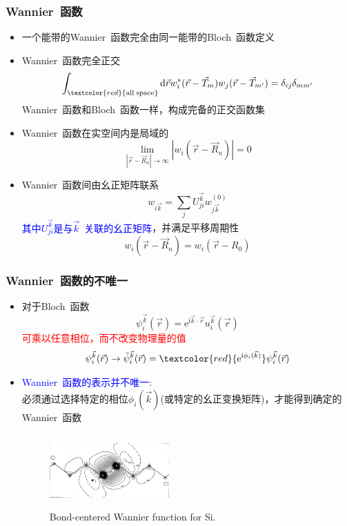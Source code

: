 {\frame
{
	\frametitle{\textrm{Wannier~}函数}
	\begin{itemize}
		\item 一个能带的\textrm{Wannier~}函数完全由同一能带的\textrm{Bloch~}函数定义
		\item \textrm{Wannier~}函数完全正交
			\begin{displaymath}
				\int_{\textcolor{red}{\mathrm{all\; space}}}\mathrm{d}\vec rw_i^{\ast}(\vec r-\vec T_m)w_j(\vec r-\vec T_{m^{\prime}})=\delta_{ij}\delta_{mm^{\prime}}
			\end{displaymath}
			\textrm{Wannier~}函数和\textrm{Bloch~}函数一样，构成完备的正交函数集
		\item \textrm{Wannier~}函数在实空间内是局域的
			\begin{displaymath}
				\lim_{|\vec r-\vec R_n|\rightarrow\infty}|w_i(\vec r-\vec R_n)|=0
			\end{displaymath}
		\item \textrm{Wannier~}函数间由幺正矩阵联系
			\begin{displaymath}
				w_{i\vec k}=\sum_jU_{ji}^{\vec k}w_{j\vec k}^{(0)}
			\end{displaymath}
			\textcolor{blue}{其中$U_{ji}^{\vec k}$是与$\vec k$~关联的幺正矩阵}，并满足平移周期性
\begin{displaymath}
	w_i(\vec r-\vec R_n)=w_i(\vec r-R_0)
\end{displaymath}
	\end{itemize}
}

\frame
{
	\frametitle{\textrm{Wannier~}函数的不唯一}
	\begin{itemize}
		\item 对于\textrm{Bloch~}函数
			\begin{displaymath}
				\psi_i^{\vec k}(\vec r)=\mathrm{e}^{\mathrm{i}\vec k\cdot\vec r}u_i^{\vec k}(\vec r)
			\end{displaymath}
			\textcolor{red}{可乘以任意相位，而不改变物理量的值}
			\begin{displaymath}
				\psi_i^{\vec k}(\vec r)\rightarrow\tilde\psi_i^{\vec k}(\vec r)=\textcolor{red}{\mathrm{e}^{\mathrm{i}\phi_i(\vec k)}}\psi_i^{\vec k}(\vec r)
			\end{displaymath}
		\item \textcolor{blue}{\textrm{Wannier~}函数的表示并不唯一}:\\
必须通过选择特定的相位$\phi_i(\vec k)$(或特定的幺正变换矩阵)，才能得到确定的\textrm{Wannier~}函数 
\begin{figure}[h!]
\centering
\vspace*{-0.2in}
\includegraphics[height=1.1in,width=1.8in,viewport=0 0 1100 600,clip]{Figures/Wannier_function-Bondcenter_Si.png}
\caption{\tiny \textrm{Bond-centered Wannier function for Si.}}%
\label{Bond-Centered Wannier function}
\end{figure} 
	\end{itemize}
}

}
